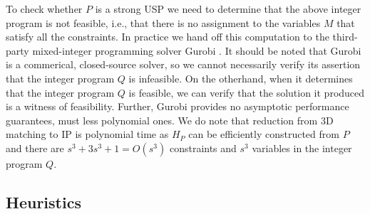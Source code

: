 \documentclass[11pt]{article}
\begin{document}


To check whether $P$ is a strong USP we need to determine that the
above integer program is not feasible,
i.e., that there is no
assignment to the variables $M$ that satisfy all the constraints.  In
practice we hand off this computation to the third-party mixed-integer
programming solver Gurobi \cite{gurobi}.  It should be noted that
Gurobi is a commerical, closed-source solver, so we cannot necessarily
verify its assertion that the integer program $Q$ is infeasible.  On
the otherhand, when it determines that the integer program $Q$ is
feasible, we can verify that the solution it produced is a witness of
feasibility.  Further, Gurobi provides no asymptotic performance
guarantees, must less polynomial ones.  We do note that reduction from
3D matching to IP is polynomial time as $H_P$ can be efficiently
constructed from $P$ and there are $s^3 + 3s^3 + 1 = O(s^3)$
constraints and $s^3$ variables in the integer program $Q$.
 
\label{subsec:mip}




\subsection{Heuristics}
\label{sec:heuristic}
\end{document}
